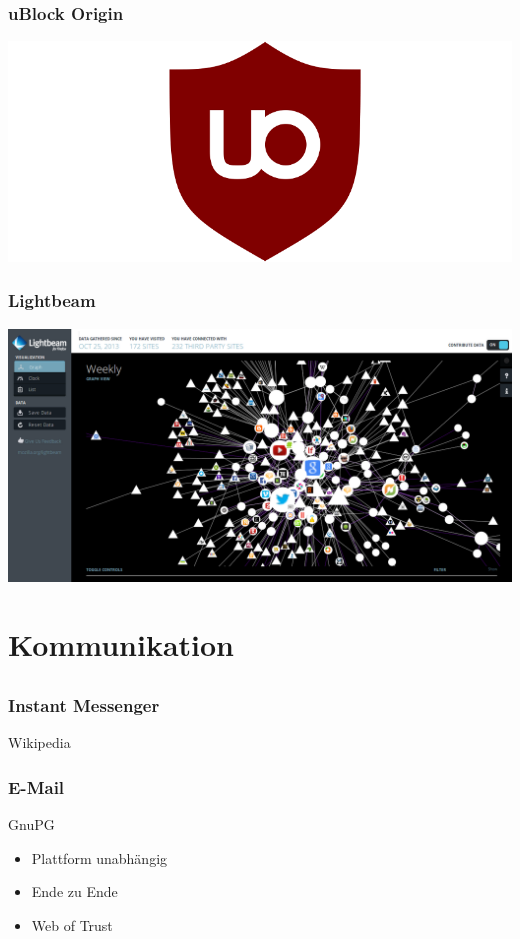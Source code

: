 \documentclass[12pt, table]{beamer}
\begin{document}
\begin{frame}
    \frametitle{uBlock Origin}
    \begin{center}
    	\includegraphics[height=0.7\textheight]{../img/ublock-edge-extension.png} 
	\end{center}       
\end{frame}

\begin{frame}
    \frametitle{Lightbeam}
    \begin{center}
    	\includegraphics[height=0.7\textheight]{../img/lightbeam.png}
    \end{center}
\end{frame}

\section{Kommunikation}
\subsection{}

\begin{frame}
	\frametitle{Instant Messenger}
	Wikipedia
\end{frame}

\begin{frame}
	\frametitle{E-Mail}
	GnuPG
	\begin{itemize}
		\item Plattform unabhängig
		\item Ende zu Ende
		\item Web of Trust
	\end{itemize}
\end{frame}
\end{document}
